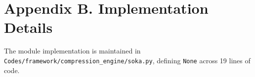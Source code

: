 \section*{Appendix B. Implementation Details}
The module implementation is maintained in \texttt{Codes/framework/compression\_engine/soka.py}, defining \texttt{None} across 19 lines of code.

